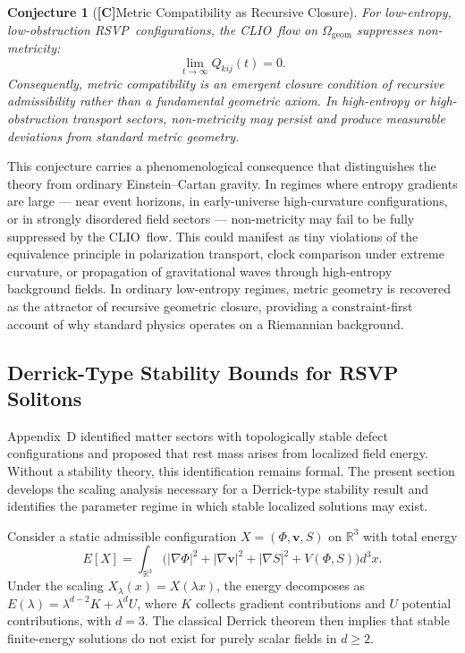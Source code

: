 \documentclass[12pt,a4paper]{article}
\newcommand{\claimC}{\textbf{[C]}\;}
\newtheorem{appconj}[defn]{Conjecture}
\newcommand{\RSVP}{\textrm{RSVP}}
\newcommand{\CLIO}{\textrm{CLIO}}
\begin{document}
\begin{appconj}[\claimC Metric Compatibility as Recursive Closure]
For low-entropy, low-obstruction \RSVP\ configurations, the \CLIO\ flow on
$\Omega_\mathrm{geom}$ suppresses non-metricity:
\[
\lim_{t\to\infty} Q_{kij}(t) = 0.
\]
Consequently, metric compatibility is an emergent closure condition of recursive
admissibility rather than a fundamental geometric axiom. In high-entropy or
high-obstruction transport sectors, non-metricity may persist and produce
measurable deviations from standard metric geometry.
\end{appconj}

This conjecture carries a phenomenological consequence that distinguishes
the theory from ordinary Einstein--Cartan gravity. In regimes where entropy
gradients are large --- near event horizons, in early-universe high-curvature
configurations, or in strongly disordered field sectors --- non-metricity may
fail to be fully suppressed by the \CLIO\ flow. This could manifest as tiny
violations of the equivalence principle in polarization transport, clock
comparison under extreme curvature, or propagation of gravitational waves
through high-entropy background fields. In ordinary low-entropy regimes,
metric geometry is recovered as the attractor of recursive geometric closure,
providing a constraint-first account of why standard physics operates on a
Riemannian background.

\subsection{Derrick-Type Stability Bounds for RSVP Solitons}

Appendix~D identified matter sectors with topologically stable defect
configurations and proposed that rest mass arises from localized field energy.
Without a stability theory, this identification remains formal. The present
section develops the scaling analysis necessary for a Derrick-type stability
result and identifies the parameter regime in which stable localized solutions
may exist.

Consider a static admissible configuration $X=(\Phi,\mathbf{v},S)$ on
$\mathbb{R}^3$ with total energy
\[
E[X] = \int_{\mathbb{R}^3}\!
\bigl(|\nabla\Phi|^2+|\nabla\mathbf{v}|^2
+|\nabla S|^2+V(\Phi,S)\bigr)d^3x.
\]
Under the scaling $X_\lambda(x)=X(\lambda x)$, the energy decomposes as
$E(\lambda)=\lambda^{d-2}K+\lambda^d U$, where $K$ collects gradient
contributions and $U$ potential contributions, with $d=3$. The classical
Derrick theorem then implies that stable finite-energy solutions do not exist
for purely scalar fields in $d\geq 2$.
\end{document}
